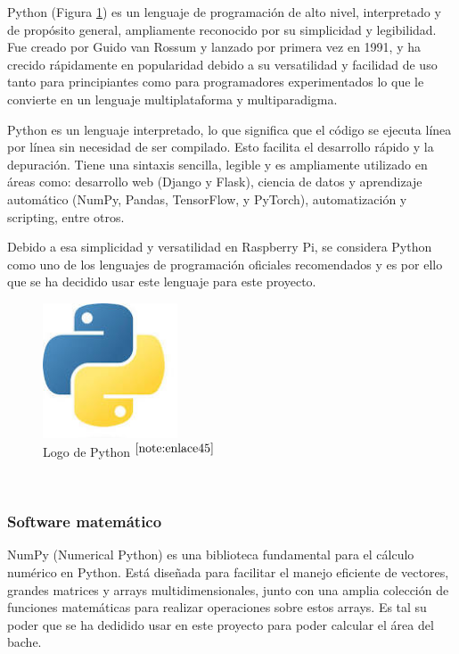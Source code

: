 Python (Figura \ref{fig:python}) es un lenguaje de programación de alto nivel, interpretado y de propósito general, ampliamente reconocido por su simplicidad y legibilidad. Fue creado por Guido van Rossum y lanzado por primera vez en 1991, y ha crecido rápidamente en popularidad debido a su versatilidad y facilidad de uso tanto para principiantes como para programadores experimentados lo que le convierte en un lenguaje multiplataforma y multiparadigma.

Python es un lenguaje interpretado, lo que significa que el código se ejecuta línea por línea sin necesidad de ser compilado. Esto facilita el desarrollo rápido y la depuración. Tiene una sintaxis sencilla, legible y es ampliamente utilizado en áreas como: desarrollo web (Django y Flask), ciencia de datos y aprendizaje automático (NumPy, Pandas, TensorFlow, y PyTorch), automatización y scripting, entre otros.

Debido a esa simplicidad y versatilidad en Raspberry Pi, se considera Python como uno de los lenguajes de programación oficiales recomendados y es por ello que se ha decidido usar este lenguaje para este proyecto.

\begin{figure} [h!]
	\begin{center}
		\includegraphics[width=4cm]{figs/python.png}
	\end{center}
	\caption{Logo de Python $^{\ref{note:enlace45}}$} 
	\label{fig:python}
\end{figure}\

\setcounter{footnote}{45} %

\subsubsection{Software matemático}

NumPy (Numerical Python) es una biblioteca fundamental para el cálculo numérico en Python. Está diseñada para facilitar el manejo eficiente de vectores, grandes matrices y arrays multidimensionales, junto con una amplia colección de funciones matemáticas para realizar operaciones sobre estos arrays. Es tal su poder que se ha dedidido usar en este proyecto para poder calcular el área del bache.

